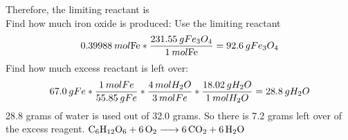 \documentclass[../main.tex]{subfiles}
\begin{document}
Therefore, the limiting reactant is  \\
Find how much iron oxide is produced: Use the limiting reactant
\begin{equation}
    0.39988\hspace{0.2em}mol \ce{Fe} * \frac{231.55\hspace{0.2em}gFe_{3}O_{4}}{1\hspace{0.2em} mol\ce{Fe}} = 92.6 \hspace{0.2em}g Fe_{3}O_{4}
\end{equation}
Find how much excess reactant is left over:
\begin{equation}
    67.0\hspace{0.2em}gFe * \frac{1\hspace{0.2em}molFe}{55.85\hspace{0.2em}gFe} * \frac{4\hspace{0.2em}mol H_{2}O}{3\hspace{0.2em}molFe} * \frac{18.02\hspace{0.2em}gH_{2}O}{1\hspace{0.2em}molH_{2}O} = 28.8\hspace{0.2em}g H_{2}O
\end{equation}
28.8 grams of water is used out of 32.0 grams. So there is 7.2 grams left over of the excess reagent. 
\AnswerSet
{}
\AnswerSet
{}
\AnswerSet
\(\ce{C6H_{12}O6 + 6O2 -> 6CO2 + 6H2O}\)
\AnswerSet
{}
\end{document}
